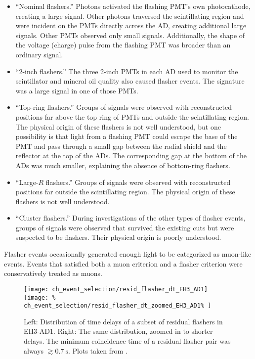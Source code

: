 \begin{itemize}
    \item ``Nominal flashers.'' Photons activated the flashing PMT's own photocathode,
        creating a large signal.
        Other photons traversed the scintillating region and were incident
        on the PMTs directly across the AD, creating additional large signals.
        Other PMTs observed only small signals.
        Additionally, the shape of the voltage (charge) pulse from the
        flashing PMT was broader than an ordinary signal.
    \item ``2-inch flashers.'' The three 2-inch PMTs in each AD
        used to monitor the scintillator and mineral oil quality also caused flasher events.
        The signature was a large signal in one of those PMTs.
    \item ``Top-ring flashers.'' Groups of signals were observed
        with reconstructed positions far above the top ring of PMTs
        and outside the scintillating region.
        The physical origin of these flashers is not well understood,
        but one possibility is that light from a flashing PMT
        could escape the base of the PMT
        and pass through a small gap between the radial shield
        and the reflector at the top of the ADs.
        The corresponding gap at the bottom of the ADs was much smaller,
        explaining the absence of bottom-ring flashers.
    \item ``Large-$R$ flashers.'' Groups of signals were observed
        with reconstructed positions far outside the scintillating region.
        The physical origin of these flashers is not well understood.
    \item ``Cluster flashers.''
        During investigations of the other types of flasher events,
        groups of signals were observed that survived the existing cuts
        but were suspected to be flashers.
        Their physical origin is poorly understood.
\end{itemize}

Flasher events occasionally generated enough light to be categorized as muon-like events.
Events that satisfied both a muon criterion and a flasher criterion
were conservatively treated as muons.

\begin{figure}
    \centering
    \texttt{[image: ch\_event\_selection/resid\_flasher\_dt\_EH3\_AD1]}
    \texttt{[image: \%
        ch\_event\_selection/resid\_flasher\_dt\_zoomed\_EH3\_AD1\%
    ]}
    \caption[Residual flasher $\Delta t$ distribution]{
        Left: Distribution of time delays
        of a subset of residual flashers in EH3-AD1.
        Right: The same distribution, zoomed in to shorter delays.
        The minimum coincidence time of a residual flasher pair was always
        $\gtrsim \SI{0.7}{\s}$.
        Plots taken from \cite{beda_resid_flasher_dt}.
    }
    \label{fig:flasher_anticorr}
\end{figure}


